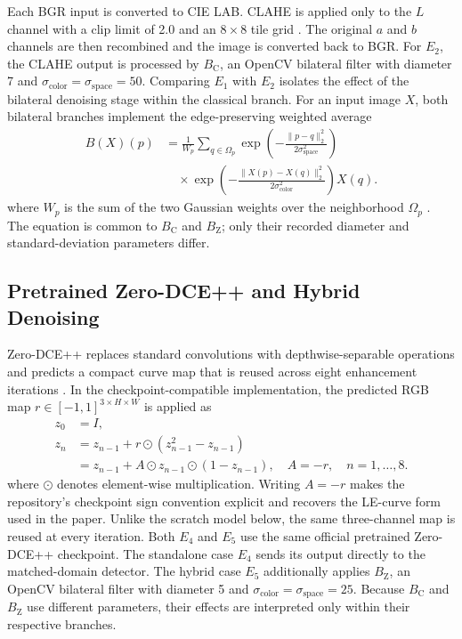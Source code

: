 \documentclass[11pt,a4paper]{article}
\begin{document}
Each BGR input is converted to CIE LAB. CLAHE is applied only to the \(L\)
channel with a clip limit of 2.0 and an \(8\times8\) tile grid
\cite{zuiderveld1994clahe}. The original
\(a\) and \(b\) channels are then recombined and the image is converted back to
BGR. For \(E_2\), the CLAHE output is processed by \(B_{\mathrm{C}}\), an
OpenCV bilateral filter with diameter 7 and
\(\sigma_{\mathrm{color}}=\sigma_{\mathrm{space}}=50\). Comparing \(E_1\)
with \(E_2\) isolates the effect of the bilateral denoising stage within the
classical branch. For an input image \(X\), both bilateral branches implement
the edge-preserving weighted average
\begin{equation}
 \begin{aligned}
 B(X)(p)&=\frac{1}{W_p}\sum_{q\in\Omega_p}
 \exp\!\left(-\frac{\lVert p-q\rVert_2^2}
 {2\sigma_{\mathrm{space}}^2}\right)\\
 &\quad\times
 \exp\!\left(-\frac{\lVert X(p)-X(q)\rVert_2^2}
 {2\sigma_{\mathrm{color}}^2}\right)X(q).
 \end{aligned}
\end{equation}
where \(W_p\) is the sum of the two Gaussian weights over the neighborhood
\(\Omega_p\) \cite{tomasi1998bilateral}. The equation is common to
\(B_{\mathrm{C}}\) and \(B_{\mathrm{Z}}\); only their recorded diameter and
standard-deviation parameters differ.

\subsection{Pretrained Zero-DCE++ and Hybrid Denoising}

Zero-DCE++ replaces standard convolutions with depthwise-separable operations
and predicts a compact curve map that is reused across eight enhancement
iterations \cite{li2021zerodce}. In the checkpoint-compatible implementation,
the predicted RGB map \(r\in[-1,1]^{3\times H\times W}\) is applied as
\begin{equation}
 \begin{aligned}
 z_0&=I,\\
 z_n&=z_{n-1}+r\odot\left(z_{n-1}^{2}-z_{n-1}\right)\\
    &=z_{n-1}+A\odot z_{n-1}\odot(1-z_{n-1}),
      \quad A=-r,\quad n=1,\ldots,8.
 \end{aligned}
\end{equation}
where \(\odot\) denotes element-wise multiplication. Writing \(A=-r\) makes
the repository's checkpoint sign convention explicit and recovers the
LE-curve form used in the paper. Unlike the scratch model below, the same
three-channel map is reused at every iteration. Both \(E_4\) and \(E_5\) use
the same official
pretrained Zero-DCE++ checkpoint. The standalone case \(E_4\) sends its output
directly to the matched-domain detector. The hybrid case \(E_5\) additionally
applies \(B_{\mathrm{Z}}\), an OpenCV bilateral filter with diameter 5 and
\(\sigma_{\mathrm{color}}=\sigma_{\mathrm{space}}=25\). Because
\(B_{\mathrm{C}}\) and \(B_{\mathrm{Z}}\) use different parameters, their
effects are interpreted only within their respective branches.
\end{document}
